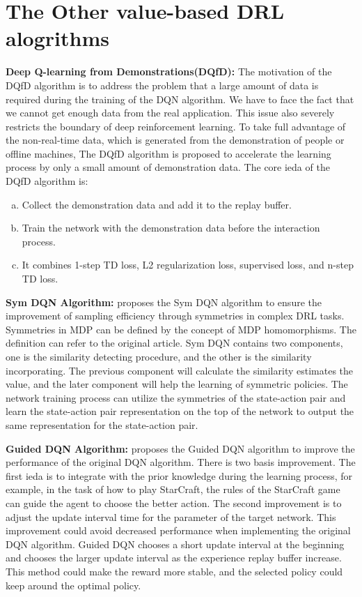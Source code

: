 \documentclass{article}
\begin{document}
\section{The Other value-based DRL alogrithms}
\label{sec:The Other value-based DRL alogrithms}
{\bf Deep Q-learning from Demonstrations(DQfD):}
The motivation of the DQfD algorithm \citep{sendonaris2017learning} is to address the problem that a large amount of data is required during the training of the DQN algorithm. We have to face the fact that we cannot get enough data from the real application. This issue also severely restricts the boundary of deep reinforcement learning. To take full advantage of the non-real-time data, which is generated from the demonstration of people or offline machines, The DQfD algorithm is proposed to accelerate the learning process by only a small amount of demonstration data. The core ieda of the DQfD algorithm is:
\begin{enumerate}[(a)]
	\item Collect the demonstration data and add it to the replay buffer.
	\item Train the network with the demonstration data before the interaction process.
	\item It combines 1-step TD loss, L2 regularization loss, supervised loss, and n-step TD loss.
\end{enumerate}

{\bf Sym DQN Algorithm:}
\citep{mahajan2017symmetry} proposes the Sym DQN algorithm to ensure the improvement of sampling efficiency through symmetries in complex DRL tasks. Symmetries in MDP can be defined by the concept of MDP homomorphisms. The definition can refer to the original article. Sym DQN contains two components, one is the similarity detecting procedure, and the other is the similarity incorporating. The previous component will calculate the similarity estimates the value, and the later component will help the learning of symmetric policies. The network training process can utilize the symmetries of the state-action pair and learn the state-action pair representation on the top of the network to output the same representation for the state-action pair. 

{\bf Guided DQN Algorithm:}
\citep{taitler2017learning} proposes the Guided DQN algorithm to improve the performance of the original DQN algorithm. There is two basis improvement. 
The first ieda is to integrate with the prior knowledge during the learning process, for example, in the task of how to play StarCraft, the rules of the StarCraft game can guide the agent to choose the better action. 
The second improvement is to adjust the update interval time for the parameter of the target network. This improvement could avoid decreased performance when implementing the original DQN algorithm. Guided DQN chooses a short update interval at the beginning and chooses the larger update interval as the experience replay buffer increase. This method could make the reward more stable, and the selected policy could keep around the optimal policy.
\end{document}
